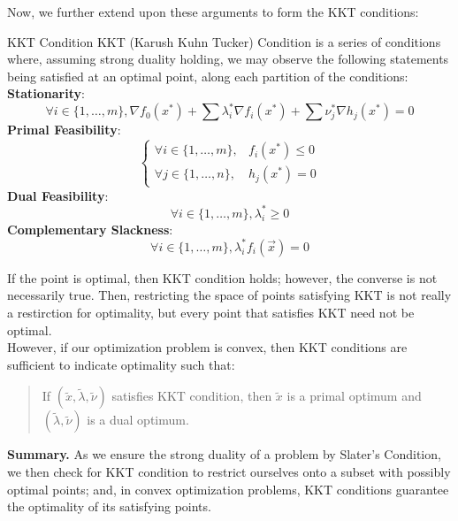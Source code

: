 Now, we further extend upon these arguments to form the KKT conditions:
\begin{ln-define}{KKT Condition}{}
    KKT (Karush Kuhn Tucker) Condition is a series of conditions where, assuming strong duality holding, we may observe the following statements being satisfied at an optimal point, along each partition of the conditions: \\
    \textbf{Stationarity}:
    \[
        \forall i \in \{1, \dots, m\}, \nabla f_0(x^*) + \sum \lambda_i^* \nabla {f_i(x^*)} + \sum \nu_j^* \nabla h_j (x^*) = 0
    \]
    \textbf{Primal Feasibility}:
    \[
        \begin{cases}
            \forall i \in \{1, \dots, m\}, &f_i(x^*) \leq 0 \\
            \forall j \in \{1, \dots, n\}, &h_j(x^*) = 0
        \end{cases}
    \]
    \textbf{Dual Feasibility}:
    \[
        \forall i \in \{1, \dots, m\}, \lambda_i^* \geq 0
    \]
    \textbf{Complementary Slackness}:
    \[
        \forall i \in \{1, \dots, m\}, \lambda_i^* f_i(\vec{x}) = 0
    \]
\end{ln-define}
If the point is optimal, then KKT condition holds; however, the converse is not necessarily true.
Then, restricting the space of points satisfying KKT is not really a restirction for optimality, but every point that satisfies KKT need not be optimal. \\
However, if our optimization problem is convex, then KKT conditions are sufficient to indicate optimality such that:
\begin{quote}
    If $(\tilde{x}, \tilde{\lambda}, \tilde{\nu})$ satisfies KKT condition, then $\tilde{x}$ is a primal optimum and $(\tilde{\lambda}, \tilde{\nu})$ is a dual optimum.
\end{quote}

\textbf{Summary.} As we ensure the strong duality of a problem by Slater's Condition, we then check for KKT condition to restrict ourselves onto a subset with possibly optimal points; and, in convex optimization problems, KKT conditions guarantee the optimality of its satisfying points.

